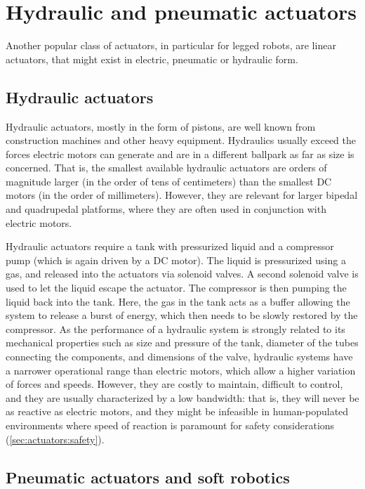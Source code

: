\section{Hydraulic and pneumatic actuators}

Another popular class of actuators, in particular for legged robots, are linear actuators, that might exist in electric, pneumatic or hydraulic form.

\subsection{Hydraulic actuators}

Hydraulic actuators, mostly in the form of pistons, are well known from construction machines and other heavy equipment. Hydraulics usually exceed the forces electric motors can generate and are in a different ballpark as far as size is concerned. That is, the smallest available hydraulic actuators are orders of magnitude larger (in the order of tens of centimeters) than the smallest DC motors (in the order of millimeters). However, they are relevant for larger bipedal and quadrupedal platforms, where they are often used in conjunction with electric motors.

Hydraulic actuators require a tank with pressurized liquid and a compressor pump (which is again driven by a DC motor). The liquid is pressurized using a gas, and released into the actuators via solenoid valves. A second solenoid valve is used to let the liquid escape the actuator. The compressor is then pumping the liquid back into the tank. Here, the gas in the tank acts as a buffer allowing the system to release a burst of energy, which then needs to be slowly restored by the compressor. As the performance of a hydraulic system is strongly related to its mechanical properties such as size and pressure of the tank, diameter of the tubes connecting the components, and dimensions of the valve, hydraulic systems have a narrower operational range than electric motors, which allow a higher variation of forces and speeds.
However, they are costly to maintain, difficult to control, and they are usually characterized by a low bandwidth: that is, they will never be as reactive as electric motors, and they might be infeasible in human-populated environments where speed of reaction is paramount for safety considerations (\cref{sec:actuators:safety}).

\subsection{Pneumatic actuators and soft robotics}

